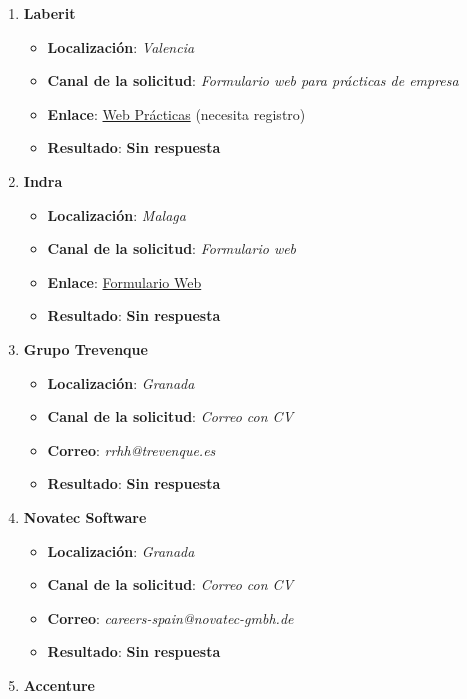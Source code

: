 \begin{enumerate}
\begin{itemize}
	\end{itemize}
	\item \textbf{Laberit}
	\begin{itemize}
		\item \textbf{Localización}: \textit{Valencia}
		\item \textbf{Canal de la solicitud}: \textit{Formulario web para prácticas de empresa}
		\item \textbf{Enlace}: \href{https://careers.laberit.com/jobs/practicas-fct-2025}{Web Prácticas} (necesita registro)
		\item \textbf{Resultado}: {\color{orange} \textbf{Sin respuesta}}
	\end{itemize}
	\item \textbf{Indra}
	\begin{itemize}
		\item \textbf{Localización}: \textit{Malaga}
		\item \textbf{Canal de la solicitud}: \textit{Formulario web}
		\item \textbf{Enlace}: \href{https://www.indracompany.com/es/trabajar-indra-1}{Formulario Web}
		\item \textbf{Resultado}: {\color{orange} \textbf{Sin respuesta}}
	\end{itemize}
	\item \textbf{Grupo Trevenque}
	\begin{itemize}
		\item \textbf{Localización}: \textit{Granada}
		\item \textbf{Canal de la solicitud}: \textit{Correo con CV}
		\item \textbf{Correo}: \textit{rrhh@trevenque.es}
		\item \textbf{Resultado}: {\color{orange} \textbf{Sin respuesta}}
	\end{itemize}
	\item \textbf{Novatec Software}
	\begin{itemize}
		\item \textbf{Localización}: \textit{Granada}
		\item \textbf{Canal de la solicitud}: \textit{Correo con CV}
		\item \textbf{Correo}: \textit{careers-spain@novatec-gmbh.de}
		\item \textbf{Resultado}: {\color{orange} \textbf{Sin respuesta}}
	\end{itemize}
	\item \textbf{Accenture}
	\begin{itemize}

\end{itemize}
\end{enumerate}
